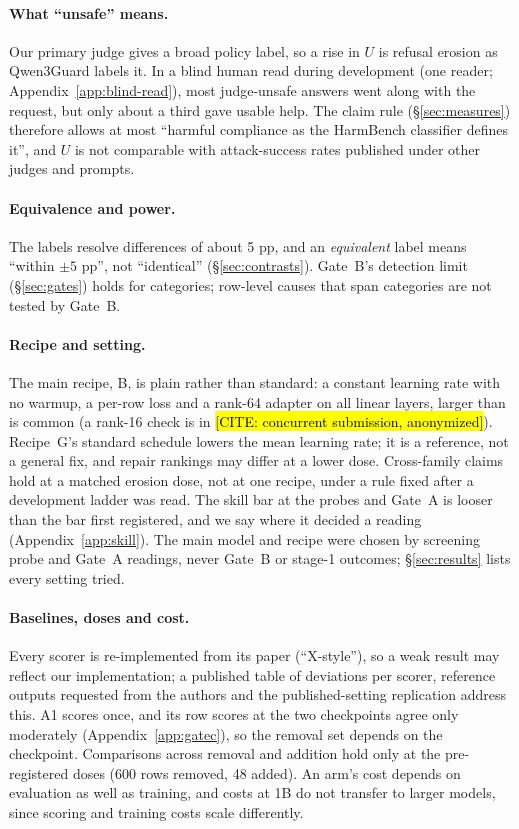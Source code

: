\documentclass{article}
\theoremstyle{plain}
\theoremstyle{definition}
\theoremstyle{remark}
\newcommand{\ph}[1]{\hl{#1}}
\begin{document}
\paragraph{What ``unsafe'' means.}
Our primary judge gives a broad policy label, so a rise in $U$ is refusal
erosion as Qwen3Guard labels it. In a blind human read during development (one
reader; Appendix~\ref{app:blind-read}), most judge-unsafe answers went along
with the request, but only about a third gave usable help. The claim rule
(\S\ref{sec:measures}) therefore allows at most ``harmful compliance as the
HarmBench classifier defines it'', and $U$ is not comparable with
attack-success rates published under other judges and prompts.

\paragraph{Equivalence and power.}
The labels resolve differences of about 5 pp, and an \emph{equivalent} label
means ``within $\pm 5$ pp'', not ``identical'' (\S\ref{sec:contrasts}). Gate~B's detection limit (\S\ref{sec:gates}) holds for
categories; row-level causes that span categories are not tested by Gate~B.

\paragraph{Recipe and setting.}
The main recipe, B, is plain rather than standard: a constant learning rate
with no warmup, a per-row loss and a rank-64 adapter on all linear layers,
larger than is common (a rank-16 check is in \ph{[CITE: concurrent submission,
anonymized]}). Recipe~G's standard schedule lowers the mean learning rate; it
is a reference, not a general fix, and repair rankings may differ at a lower
dose. Cross-family claims hold at a matched erosion dose, not at one recipe,
under a rule fixed after a development ladder was read. The skill bar
at the probes and Gate~A is looser than the bar first registered, and we say
where it decided a reading (Appendix~\ref{app:skill}). The main model and
recipe were chosen by screening probe and Gate~A readings, never Gate~B or
stage-1 outcomes; \S\ref{sec:results} lists every setting tried.

\paragraph{Baselines, doses and cost.}
Every scorer is re-implemented from its paper (``X-style''), so a weak result
may reflect our implementation; a published table of deviations per scorer,
reference outputs requested from the authors and the published-setting
replication address this. A1 scores once, and its row scores at the two checkpoints agree only moderately (Appendix~\ref{app:gatec}), so the removal set depends on
the checkpoint.
Comparisons across removal and addition hold only at
the pre-registered doses (600 rows removed, 48 added). An arm's cost depends on evaluation as well as training, and costs at 1B do not transfer to larger models, since scoring and training costs scale differently.
\end{document}
